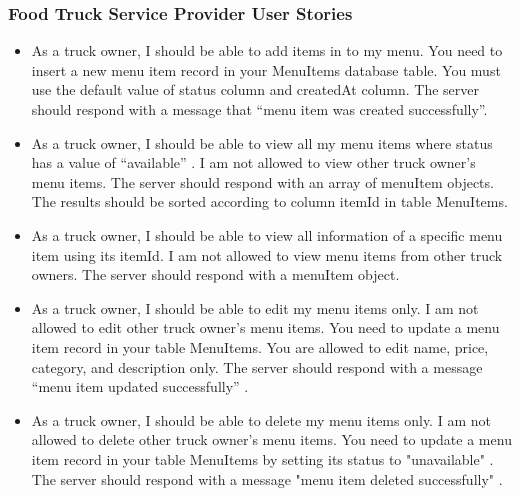 \documentclass[12pt,a4paper]{article}
\begin{document}
\subsubsection{Food Truck Service Provider User Stories}
\begin{storybox}
\begin{itemize}[leftmargin=1em, itemsep=6pt]
    \item As a truck owner, I should be able to add items in to my menu. You need to insert a new menu item record in your MenuItems database table. You must use the default value of status column and createdAt column. The server should respond with a message that “menu item was created successfully”.
    \item As a truck owner, I should be able to view all my menu items where status has a value of “available” . I am not allowed to view other truck owner’s menu items. The server should respond with an array of menuItem objects. The results should be sorted according to column itemId in table MenuItems.
    \item As a truck owner, I should be able to view all information of a specific menu item using its itemId. I am not allowed to view menu items from other truck owners. The server should respond with a menuItem object.
    \item As a truck owner, I should be able to edit my menu items only. I am not allowed to edit other truck owner’s menu items. You need to update a menu item record in your table MenuItems. You are allowed to edit name, price, category, and description only. The server should respond with a message “menu item updated successfully” .
    \item As a truck owner, I should be able to delete my menu items only. I am not allowed to delete other truck owner's menu items. You need to update a menu item record in your table MenuItems by setting its status to "unavailable" . The server should respond with a message "menu item deleted successfully" .
\end{itemize}
\end{storybox}

\newpage
\end{document}
